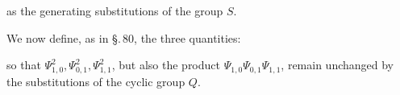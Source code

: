 as the generating substitutions of the group $S$.

We now define, as in \S.\,80, the three quantities:

so that $\Psi^2_{1,0}, \Psi^2_{0,1}, \Psi^2_{1,1}$, but also the product
$\Psi_{1,0}\Psi_{0,1}\Psi_{1,1}$, remain unchanged by the substitutions
of the cyclic group $Q$.
